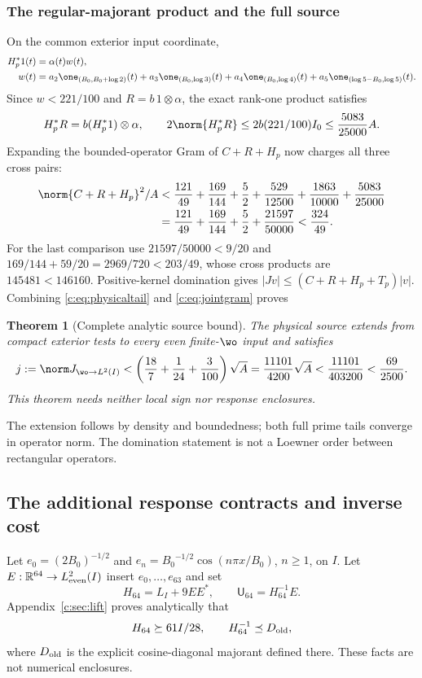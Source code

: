 \documentclass[11pt,a4paper]{article}
\numberwithin{equation}{section}
\newtheorem{theorem}{Theorem}[section]
\theoremstyle{definition}\newtheorem{definition}[theorem]{Definition}
\theoremstyle{remark}\newtheorem{remark}[theorem]{Remark}
\newcommand{\R}{\mathbb R}\newcommand{\C}{\mathbb C}\newcommand{\N}{\mathbb N}
\begin{document}
\subsubsection{The regular-majorant product and the full source}
On the common exterior input coordinate,
\begin{align*}
 H_p^*1(t)&=\alpha(t)w(t),\\
 w(t)&=a_2\one_{({B_0},{B_0}+\log2)}(t)+a_3\one_{({B_0},\log3)}(t)
 +a_4\one_{({B_0},\log4)}(t)+a_5\one_{(\log5-{B_0},\log5)}(t).
\end{align*}
Since $w<221/100$ and $R=b\,1\otimes\alpha$, the exact rank-one product satisfies
\begin{equation}\label{c:eq:HpR}
 H_p^*R=b(H_p^*1)\otimes\alpha,\qquad
 2\norm{H_p^*R}\le2b(221/100)I_0\le\frac{5083}{25000}A.
\end{equation}
Expanding the bounded-operator Gram of $C+R+H_p$ now charges all three cross pairs:
\begin{align}
 \norm{C+R+H_p}^2/A
 &<\frac{121}{49}+\frac{169}{144}+\frac52+
   \frac{529}{12500}+\frac{1863}{10000}+\frac{5083}{25000}\notag\\
 &=\frac{121}{49}+\frac{169}{144}+\frac52+\frac{21597}{50000}
 <\frac{324}{49}.\label{c:eq:jointgram}
\end{align}
For the last comparison use $21597/50000<9/20$ and
$169/144+59/20=2969/720<203/49$, whose cross products are
$145481<146160$.
Positive-kernel domination gives
$|Jv|\le(C+R+H_p+T_p)|v|$.
Combining \eqref{c:eq:physicaltail} and \eqref{c:eq:jointgram} proves
\begin{theorem}[Complete analytic source bound]\label{c:thm:source}
The physical source extends from compact exterior tests to every even finite-$\wo$ input and satisfies
\begin{equation}\label{c:eq:sourcej}
 j:=\norm J_{\wo\to L^2(I)}
 <\left(\frac{18}{7}+\frac1{24}+\frac3{100}\right)\sqrt A
 =\frac{11101}{4200}\sqrt A<\frac{11101}{403200}<\frac{69}{2500}.
\end{equation}
This theorem needs neither local sign nor response enclosures.
\end{theorem}
The extension follows by density and boundedness; both full prime tails converge in operator norm. The domination statement is not a Loewner order between rectangular operators.

\subsection{The additional response contracts and inverse cost}\label{c:sec:response}
Let $e_0=(2{B_0})^{-1/2}$ and
$e_n={B_0}^{-1/2}\cos(n\pi x/{B_0})$, $n\ge1$, on $I$.
Let $E:\R^{64}\to L^2_{\rm even}(I)$ insert $e_0,\ldots,e_{63}$ and set
\[
 H_{64}=L_I+9EE^*,\qquad \mathsf U_{64}=H_{64}^{-1}E.
\]
Appendix~\ref{c:sec:lift} proves analytically that
\begin{equation}\label{c:eq:Hcoercivity}
 H_{64}\succeq61I/28,\qquad H_{64}^{-1}\preceq D_{\rm old},
\end{equation}
where $D_{\rm old}$ is the explicit cosine-diagonal majorant defined there.
These facts are not numerical enclosures.
\end{document}
